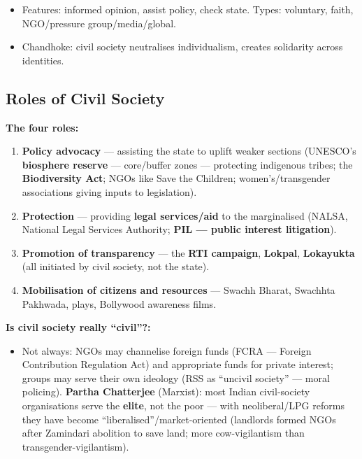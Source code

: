 \begin{QuickRevision}
\begin{itemize}
\item Features: informed opinion, assist policy, check state. Types: voluntary, faith, NGO/pressure group/media/global.
\item Chandhoke: civil society neutralises individualism, creates solidarity across identities.
\end{itemize}
\end{QuickRevision}

\sectiondivider

\subsection{Roles of Civil Society}

\begin{DataFact}
\textbf{The four roles:}
\begin{enumerate}
\item \textbf{Policy advocacy} --- assisting the state to uplift weaker sections (UNESCO's \textbf{biosphere reserve} --- core/buffer zones --- protecting indigenous tribes; the \textbf{Biodiversity Act}; NGOs like Save the Children; women's/transgender associations giving inputs to legislation).
\item \textbf{Protection} --- providing \textbf{legal services/aid} to the marginalised (NALSA, National Legal Services Authority; \textbf{PIL --- public interest litigation}).
\item \textbf{Promotion of transparency} --- the \textbf{RTI campaign}, \textbf{Lokpal}, \textbf{Lokayukta} (all initiated by civil society, not the state).
\item \textbf{Mobilisation of citizens and resources} --- Swachh Bharat, Swachhta Pakhwada, plays, Bollywood awareness films.
\end{enumerate}
\end{DataFact}

\begin{CriticalPoint}
\textbf{Is civil society really ``civil''?:}
\begin{itemize}
\item Not always: NGOs may channelise foreign funds (FCRA --- Foreign Contribution Regulation Act) and appropriate funds for private interest; groups may serve their own ideology (RSS as ``uncivil society'' --- moral policing). \textbf{Partha Chatterjee} (Marxist): most Indian civil-society organisations serve the \textbf{elite}, not the poor --- with neoliberal/LPG reforms they have become ``liberalised''/market-oriented (landlords formed NGOs after Zamindari abolition to save land; more cow-vigilantism than transgender-vigilantism).
\end{itemize}
\end{CriticalPoint}

